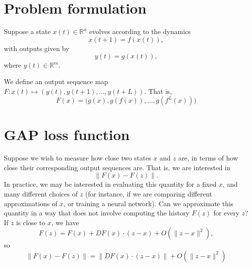 \documentclass[11pt]{article}
\begin{document}
\section{Problem formulation}
\label{sec:problem-formulation}

Suppose a state $x(t)\in\mathbb{R}^n$ evolves according to the dynamics
\begin{equation}
  \label{eq:1}
  x(t+1) = f(x(t)),
\end{equation}
with outputs given by
\begin{equation}
  \label{eq:2}
  y(t) = g(x(t)),
\end{equation}
where $y(t)\in\mathbb{R}^m$.

We define an output sequence map $F:x(t)\mapsto
(y(t),y(t+1),\ldots,y(t+{L}))$.  That is,
\begin{equation}
  \label{eq:3}
  F(x) = \big(g(x),g(f(x)),\ldots,g(f^{L}(x))\big)
\end{equation}

\section{GAP loss function}
\label{sec:gap-loss-function}

Suppose we wish to measure how close two states $x$ and $z$ are, in terms of how
close their corresponding output sequences are.  That is, we are interested in
\begin{equation}
  \label{eq:4}
  \|F(x) - F(z)\|.
\end{equation}
In practice, we may be interested in evaluating this quantity for a fixed $x$,
and many different choices of $z$ (for instance, if we are comparing different
approximations of $x$, or training a neural network).  Can we approximate this
quantity in a way that does not involve computing the history $F(z)$ for
every $z$?  If $z$ is close to $x$, we have
\begin{equation}
  \label{eq:5}
  F(z) = F(x) + DF(x)\cdot (z-x) + O(\|z-x\|^2),
\end{equation}
so
\begin{equation}
  \label{eq:6}
  \|F(x) - F(z)\| = \|DF(x)\cdot(z-x)\| + O(\|z-x\|^2)
\end{equation}
\end{document}
